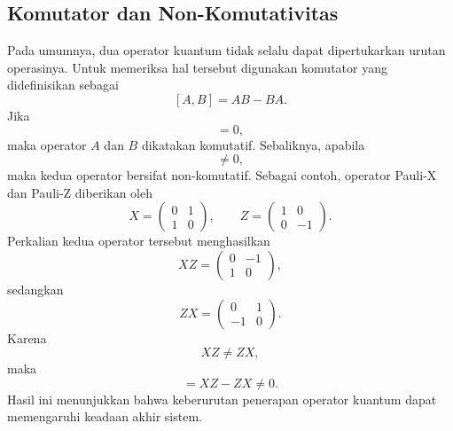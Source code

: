 \subsection{Komutator dan Non-Komutativitas}
Pada umumnya, dua operator kuantum tidak selalu dapat dipertukarkan urutan operasinya. Untuk memeriksa hal tersebut digunakan komutator yang didefinisikan sebagai
\begin{equation}
\label{eq:commutator_property}
    [A,B]
    =
    AB
    -
    BA.
\end{equation}
Jika
\begin{equation}
    [A,B]=0,
\end{equation}
maka operator $A$ dan $B$ dikatakan komutatif. Sebaliknya, apabila
\begin{equation}
    [A,B]\neq 0,
\end{equation}
maka kedua operator bersifat non-komutatif.
Sebagai contoh, operator Pauli-X dan Pauli-Z diberikan oleh
\begin{equation}
    X=
    \begin{pmatrix}
        0 & 1 \\
        1 & 0
    \end{pmatrix},
    \qquad
    Z=
    \begin{pmatrix}
        1 & 0 \\
        0 & -1
    \end{pmatrix}.
\end{equation}
Perkalian kedua operator tersebut menghasilkan
\begin{equation}
    XZ=
    \begin{pmatrix}
        0 & -1 \\
        1 & 0
    \end{pmatrix},
\end{equation}
sedangkan
\begin{equation}
    ZX=
    \begin{pmatrix}
        0 & 1 \\
        -1 & 0
    \end{pmatrix}.
\end{equation}
Karena
\begin{equation}
    XZ \neq ZX,
\end{equation}
maka
\begin{equation}
    [X,Z]
    =
    XZ-ZX
    \neq 0.
\end{equation}
Hasil ini menunjukkan bahwa keberurutan penerapan operator kuantum dapat memengaruhi keadaan akhir sistem.